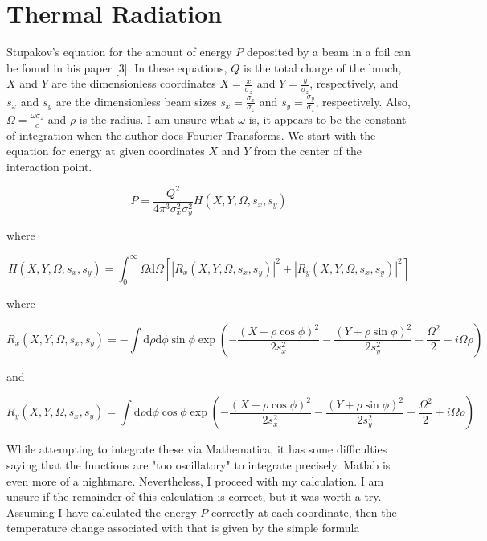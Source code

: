 \documentclass[12pt]{article}
\begin{document}
\section{Thermal Radiation}

Stupakov's equation for the amount of energy $P$ deposited by a beam in a foil can be found in his paper [3]. In these equations, $Q$ is the total charge of the bunch, $X$ and $Y$ are the dimensionless coordinates $X=\frac{x}{\sigma_z}$ and $Y=\frac{y}{\sigma_z}$, respectively, and $s_x$ and $s_y$ are the dimensionless beam sizes $s_x=\frac{\sigma_x}{\sigma_z}$ and $s_y=\frac{\sigma_y}{\sigma_z}$, respectively. Also, $\Omega=\frac{\omega \sigma_z}{c}$ and $\rho$ is the radius. I am unsure what $\omega$ is, it appears to be the constant of integration when the author does Fourier Transforms. We start with the equation for energy at given coordinates $X$ and $Y$ from the center of the interaction point.

\begin{equation}
P=\frac{Q^2}{4 \pi^{3} \sigma_{x}^{2} \sigma_{y}^{2}} H(X,Y,\Omega,s_x,s_y)
\end{equation}

where

\begin{equation}
H(X,Y,\Omega,s_x,s_y)=\int_0^{\infty} \Omega \mathrm{d} \Omega [|R_{x} (X,Y,\Omega,s_x,s_y)|^2+|R_{y} (X,Y,\Omega,s_x,s_y)|^2]
\end{equation}

where

\begin{equation}
R_{x} (X,Y,\Omega,s_x,s_y)=- \int \mathrm{d} \rho \mathrm{d} \phi \sin \phi \exp{(-\frac{(X+\rho \cos \phi)^2}{2 s_{x}^{2}}-\frac{(Y+\rho \sin \phi)^2}{2 s_{y}^{2}}-\frac{\Omega^2}{2}+i \Omega \rho)}
\end{equation}

and

\begin{equation}
R_{y} (X,Y,\Omega,s_x,s_y)= \int \mathrm{d} \rho \mathrm{d} \phi \cos \phi \exp{(-\frac{(X+\rho \cos \phi)^2}{2 s_{x}^{2}}-\frac{(Y+\rho \sin \phi)^2}{2 s_{y}^{2}}-\frac{\Omega^2}{2}+i \Omega \rho)}
\end{equation}

While attempting to integrate these via Mathematica, it has some difficulties saying that the functions are "too oscillatory" to integrate precisely. Matlab is even more of a nightmare. Nevertheless, I proceed with my calculation. I am unsure if the remainder of this calculation is correct, but it was worth a try. Assuming I have calculated the energy $P$ correctly at each coordinate, then the temperature change associated with that is given by the simple formula
\end{document}
